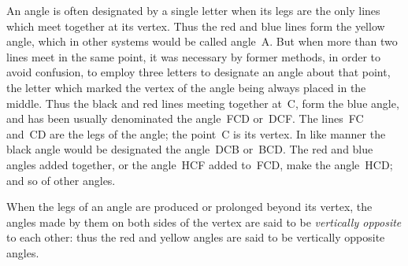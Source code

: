 \documentclass[12pt]{article}
\begin{document}
\noindent
\begin{minipage}[t]{0.34\linewidth}
  \vspace{0pt}\centering
  \drawCurrentPicture
\end{minipage}\hfill
\begin{minipage}[t]{0.62\linewidth}
  \vspace{0pt}
  An angle is often designated by a single letter when its legs are the only
  lines which meet together at its vertex. Thus the red and blue lines form
  the yellow angle, which in other systems would be called angle~A. But when
  more than two lines meet in the same point, it was necessary by former
  methods, in order to avoid confusion, to employ three letters to designate
  an angle about that point, the letter which marked the vertex of the angle
  being always placed in the middle. Thus the black and red lines meeting
  together at~C, form the blue angle, and has been usually denominated the
  angle~FCD or~DCF. The lines~FC and~CD are the legs of the angle; the
  point~C is its vertex. In like manner the black angle would be designated
  the angle~DCB or~BCD. The red and blue angles added together, or the
  angle~HCF added to~FCD, make the angle~HCD; and so of other angles.
\end{minipage}

\vspace{0.5cm}

\noindent
When the legs of an angle are produced or prolonged beyond its vertex, the
angles made by them on both sides of the vertex are said to be
\emph{vertically opposite} to each other: thus the red and yellow angles are
said to be vertically opposite angles.
\end{document}
